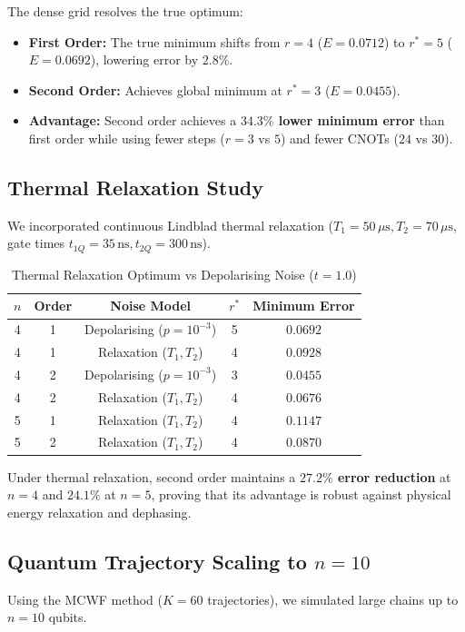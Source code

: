 \documentclass[conference]{IEEEtran}
\begin{document}
The dense grid resolves the true optimum:
\begin{itemize}
    \item \textbf{First Order:} The true minimum shifts from $r = 4$ ($E = 0.0712$) to \textbf{$r^* = 5$} ($E = 0.0692$), lowering error by $2.8\%$.
    \item \textbf{Second Order:} Achieves global minimum at \textbf{$r^* = 3$} ($E = 0.0455$).
    \item \textbf{Advantage:} Second order achieves a \textbf{$34.3\%$ lower minimum error} than first order while using fewer steps ($r=3$ vs $5$) and fewer CNOTs ($24$ vs $30$).
\end{itemize}

\subsection{Thermal Relaxation Study}
We incorporated continuous Lindblad thermal relaxation ($T_1 = 50\,\mu\text{s}, T_2 = 70\,\mu\text{s}$, gate times $t_{1Q} = 35\,\text{ns}, t_{2Q} = 300\,\text{ns}$).

\begin{table}[htbp]
\caption{Thermal Relaxation Optimum vs Depolarising Noise ($t=1.0$)}
\begin{center}
\begin{tabular}{ccccc}
\toprule
$n$ & Order & Noise Model & $r^*$ & Minimum Error \\
\midrule
4 & 1 & Depolarising ($p=10^{-3}$) & 5 & $0.0692$ \\
4 & 1 & Relaxation ($T_1, T_2$)     & 4 & $0.0928$ \\
4 & 2 & Depolarising ($p=10^{-3}$) & 3 & $0.0455$ \\
4 & 2 & Relaxation ($T_1, T_2$)     & 4 & $0.0676$ \\
5 & 1 & Relaxation ($T_1, T_2$)     & 4 & $0.1147$ \\
5 & 2 & Relaxation ($T_1, T_2$)     & 4 & $0.0870$ \\
\bottomrule
\end{tabular}
\end{center}
\label{tab:relaxation}
\end{table}

Under thermal relaxation, second order maintains a \textbf{$27.2\%$ error reduction} at $n=4$ and \textbf{$24.1\%$} at $n=5$, proving that its advantage is robust against physical energy relaxation and dephasing.

\subsection{Quantum Trajectory Scaling to $n=10$}
Using the MCWF method ($K = 60$ trajectories), we simulated large chains up to $n = 10$ qubits.
\end{document}
